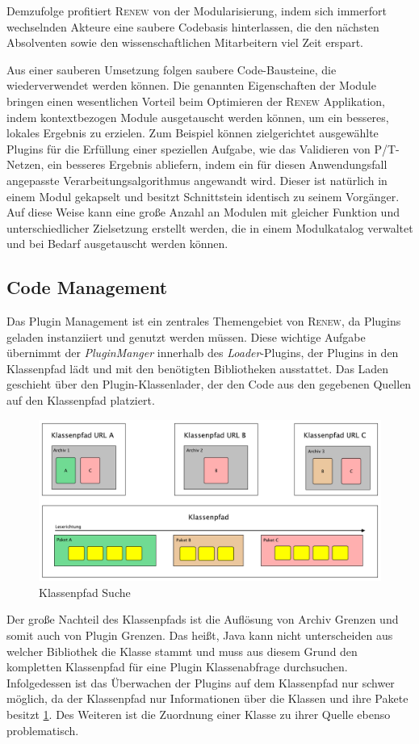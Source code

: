 		Demzufolge profitiert \textsc{Renew} von der Modularisierung, indem sich immerfort wechselnden Akteure eine saubere Codebasis hinterlassen, die den nächsten Absolventen sowie den wissenschaftlichen Mitarbeitern viel Zeit erspart. \bigbreak

		Aus einer sauberen Umsetzung folgen saubere Code-Bausteine, die wiederverwendet werden können. Die genannten Eigenschaften der Module bringen einen wesentlichen Vorteil beim Optimieren der \textsc{Renew} Applikation, indem kontextbezogen Module ausgetauscht werden können, um ein besseres, lokales Ergebnis zu erzielen. Zum Beispiel können zielgerichtet ausgewählte Plugins für die Erfüllung einer speziellen Aufgabe, wie das Validieren von P/T-Netzen, ein besseres Ergebnis abliefern, indem ein für diesen Anwendungsfall angepasste Verarbeitungsalgorithmus angewandt wird. Dieser ist natürlich in einem Modul gekapselt und besitzt Schnittstein identisch zu seinem Vorgänger. Auf diese Weise kann eine große Anzahl an Modulen mit gleicher Funktion und unterschiedlicher Zielsetzung erstellt werden, die in einem Modulkatalog verwaltet und bei Bedarf ausgetauscht werden können.

	\subsection{Code Management}\label{sub:code_managment}
		Das Plugin Management ist ein zentrales Themengebiet von \textsc{Renew}, da Plugins geladen instanziiert und genutzt werden müssen. Diese wichtige Aufgabe übernimmt der \textit{PluginManger} innerhalb des \textit{Loader}-Plugins, der Plugins in den Klassenpfad lädt und mit den benötigten Bibliotheken ausstattet. Das Laden geschieht über den Plugin-Klassenlader, der den Code aus den gegebenen Quellen auf den Klassenpfad platziert.\bigbreak
		\begin{figure}[t]
		  \centering
		  \includegraphics[width=\textwidth]{material/images/Klassenpfad.pdf}
		  \caption{Klassenpfad Suche \cite{kothagal2017modular}}
		  \label{fig:CP_Struktur}
		\end{figure}
		Der große Nachteil des Klassenpfads ist die Auflösung von Archiv Grenzen und somit auch von Plugin Grenzen. Das heißt, Java kann nicht unterscheiden aus welcher Bibliothek die Klasse stammt und muss aus diesem Grund den kompletten Klassenpfad für eine Plugin Klassenabfrage durchsuchen. Infolgedessen ist das Überwachen der Plugins auf dem Klassenpfad nur schwer möglich, da der Klassenpfad nur Informationen über die Klassen und ihre Pakete besitzt \ref{fig:CP_Struktur}. Des Weiteren ist die Zuordnung einer Klasse zu ihrer Quelle ebenso problematisch.\bigbreak

